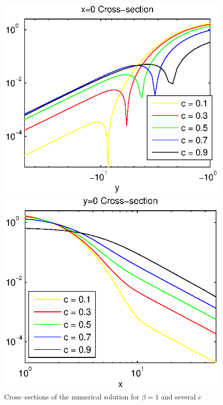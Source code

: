 \documentclass[leqno,11pt]{book}
\begin{document}
\begin{figure}[ht]
\begin{minipage}[b]{0.5\linewidth}
	\end{minipage}
	\begin{minipage}[b]{0.5\linewidth}
		\raggedleft
		\includegraphics[width=\linewidth]{cross-sections/c=01__09beta=1Logx=0.eps}
	\end{minipage}	
	\begin{minipage}[b]{0.5\linewidth}
		\raggedright
		 \includegraphics[width=\linewidth]{cross-sections/c=01__09beta=1Logy=0.eps}
	\end{minipage}
	\caption{Cross--sections of the numerical solution for $\beta=1$ and several  $c$}
	\label{profilesSpeedVarying}
\end{figure}
\end{document}
